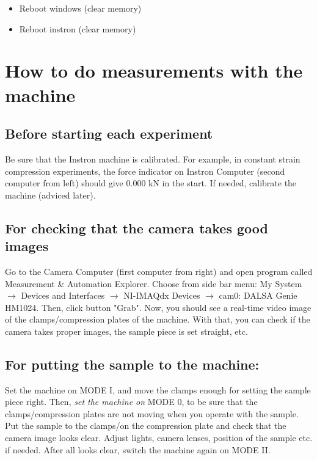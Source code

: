 \documentclass[a4paper]{article}
\begin{document}
\begin{itemize}
	\item Reboot windows (clear memory)
  \item Reboot instron (clear memory)
\end{itemize}

\section{How to do measurements with the machine}

\subsection{Before starting each experiment} 

Be sure that the Instron machine is calibrated. For example, in constant 
strain compression experiments, the force indicator on Instron Computer 
(second computer from left) should give 0.000 kN in the start. If needed, 
calibrate the machine (adviced later).

\subsection{For checking that the camera takes good images} 

Go to the Camera Computer (first computer from right) and open program 
called Measurement \& Automation Explorer. Choose from side bar menu: 
My System $\rightarrow$ Devices and Interfaces $\rightarrow$ NI-IMAQdx Devices 
$\rightarrow$ cam0: DALSA Genie HM1024. Then, click button "Grab". Now, you 
should see a real-time video image of the clamps/compression plates of the 
machine. With that, you can check if the camera takes proper images, the 
sample piece is set straight, etc.

\subsection{For putting the sample to the machine:} 

Set the machine on \textsf{MODE I}, and move the clamps enough for setting 
the sample piece right. Then, \emph{set the machine on} \textsf{MODE 0}, 
to be sure that the clamps/compression plates are not moving when you operate 
with the sample. Put the sample to the clamps/on the compression plate and 
check that the camera image looks clear. Adjust lights, 
camera lenses, position of the sample etc. if needed. After all looks clear, 
switch the machine again on \textsf{MODE II}. 
\end{document}
